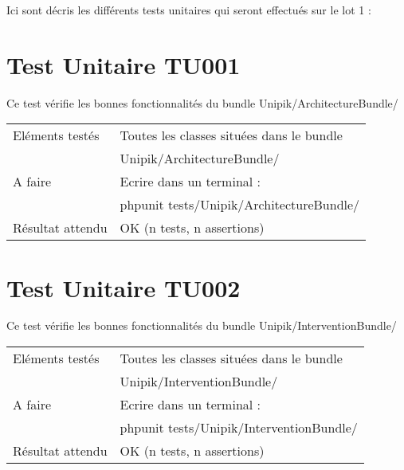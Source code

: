 
Ici sont décris les différents tests unitaires qui seront effectués sur le lot 1 :

\section{Test Unitaire TU001}
	
	Ce test vérifie les bonnes fonctionnalités du bundle Unipik/ArchitectureBundle/ \\
				
  	\begin{center}
  		\begin{tabular}[h]{|p{}|p{}|}
		\hline
			Eléments testés & Toutes les classes situées dans le bundle \\ 																& Unipik/ArchitectureBundle/ \\\hline
    			A faire & Ecrire dans un terminal : \\ 
    					& phpunit tests/Unipik/ArchitectureBundle/\\\hline
    			Résultat attendu & OK (n tests, n assertions) \\\hline
     	\end{tabular}
  	\end{center}	
  		
\section{Test Unitaire TU002}
	
	Ce test vérifie les bonnes fonctionnalités du bundle Unipik/InterventionBundle/ \\
				
  	\begin{center}
  		\begin{tabular}[h]{|p{}|p{}|}
		\hline
			Eléments testés & Toutes les classes situées dans le bundle \\ 																& Unipik/InterventionBundle/ \\\hline
    			A faire & Ecrire dans un terminal : \\ 
    					& phpunit tests/Unipik/InterventionBundle/\\\hline
    			Résultat attendu & OK (n tests, n assertions) \\\hline
     	\end{tabular}
  	\end{center}	   		
   		

